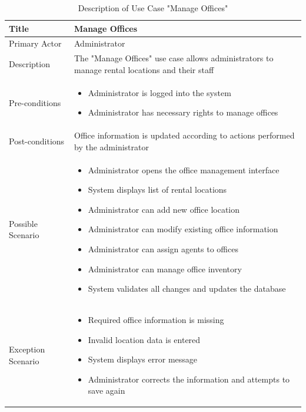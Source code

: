 \begin{table}[H]
    \centering
    \vspace{0.5cm}
    \caption{Description of Use Case "Manage Offices"}
    \vspace{0.3cm}
    \begin{tabular}{|p{3cm}|p{12cm}|}
        \hline
        Title & Manage Offices \\
        \hline
        Primary Actor & Administrator \\
        \hline
        Description & The "Manage Offices" use case allows administrators to manage rental locations and their staff \\
        \hline
        Pre-conditions & \begin{itemize}
            \item Administrator is logged into the system
            \item Administrator has necessary rights to manage offices
        \end{itemize} \\
        \hline
        Post-conditions & Office information is updated according to actions performed by the administrator \\
        \hline
        Possible Scenario & \begin{itemize}
            \item Administrator opens the office management interface
            \item System displays list of rental locations
            \item Administrator can add new office location
            \item Administrator can modify existing office information
            \item Administrator can assign agents to offices
            \item Administrator can manage office inventory
            \item System validates all changes and updates the database
        \end{itemize} \\
        \hline
        Exception Scenario & \begin{itemize}
            \item Required office information is missing
            \item Invalid location data is entered
            \item System displays error message
            \item Administrator corrects the information and attempts to save again
        \end{itemize} \\
        \hline
    \end{tabular}
    \vspace{0.5cm}
\end{table}

